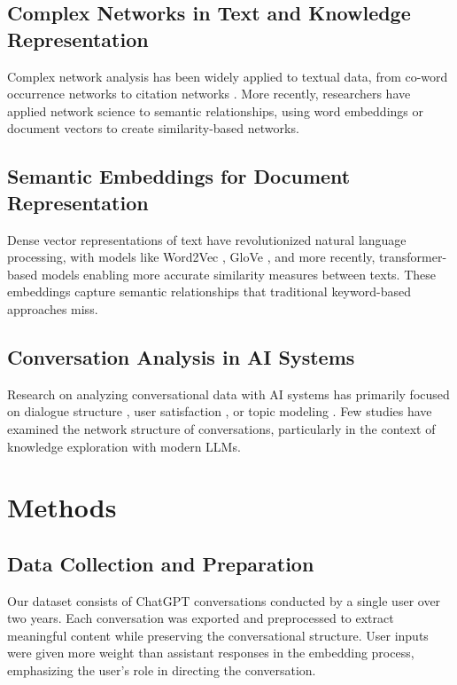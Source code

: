 \documentclass[10pt, a4paper]{article}
\begin{document}
\subsection{Complex Networks in Text and Knowledge Representation}

Complex network analysis has been widely applied to textual data, from co-word occurrence networks \cite{callon1983} to citation networks \cite{price1965}. More recently, researchers have applied network science to semantic relationships, using word embeddings \cite{levy2014} or document vectors \cite{mikolov2013} to create similarity-based networks.

\subsection{Semantic Embeddings for Document Representation}

Dense vector representations of text have revolutionized natural language processing, with models like Word2Vec \cite{mikolov2013}, GloVe \cite{pennington2014}, and more recently, transformer-based models \cite{devlin2019} enabling more accurate similarity measures between texts. These embeddings capture semantic relationships that traditional keyword-based approaches miss.

\subsection{Conversation Analysis in AI Systems}

Research on analyzing conversational data with AI systems has primarily focused on dialogue structure \cite{serban2016}, user satisfaction \cite{venkatesh2018}, or topic modeling \cite{zeng2019}. Few studies have examined the network structure of conversations, particularly in the context of knowledge exploration with modern LLMs.

\section{Methods}

\subsection{Data Collection and Preparation}

Our dataset consists of ChatGPT conversations conducted by a single user over two years. Each conversation was exported and preprocessed to extract meaningful content while preserving the conversational structure. User inputs were given more weight than assistant responses in the embedding process, emphasizing the user's role in directing the conversation.
\end{document}
